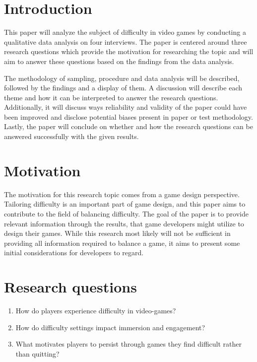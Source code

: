 
\section{Introduction}


This paper will analyze the subject of difficulty in video games by conducting a qualitative data analysis on four interviews. The paper is centered around three research questions which provide the motivation for researching the topic and will aim to answer these questions based on the findings from the data analysis. 

The methodology of sampling, procedure and data analysis will be described, followed by the findings and a display of them. A discussion will describe each theme and how it can be interpreted to answer the research questions. Additionally, it will discuss ways reliability and validity of the paper could have been improved and disclose potential biases present in paper or test methodology. Lastly, the paper will conclude on whether and how the research questions can be answered successfully with the given results. 

\section{Motivation}

The motivation for this research topic comes from a game design perspective. Tailoring difficulty is an important part of game design, and this paper aims to contribute to the field of balancing difficulty. The goal of the paper is to provide relevant information through the results, that game developers might utilize to design their games. While this research most likely will not be sufficient in providing all information required to balance a game, it aims to present some initial considerations for developers to regard.

\section{Research questions} \label{Research questions}

\begin{enumerate}
    \item How do players experience difficulty in video-games?
    \item How do difficulty settings impact immersion and engagement? 
    \item What motivates players to persist through games they find difficult rather than quitting?
\end{enumerate}

